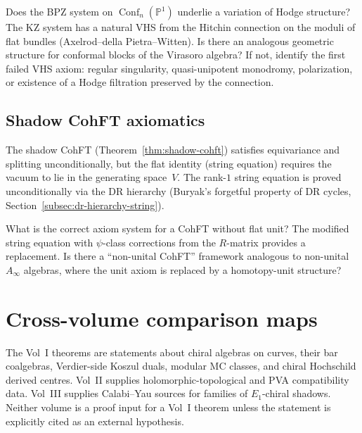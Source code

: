 \begin{question}\label{q:bpz-hitchin}
Does the BPZ system on
$\operatorname{Conf}_n(\mathbb{P}^1)$ underlie a variation of
Hodge structure? The KZ system has a natural VHS from the Hitchin
connection on the moduli of flat bundles (Axelrod--della
Pietra--Witten). Is there an analogous geometric structure for
conformal blocks of the Virasoro algebra? If not, identify the first
failed VHS axiom: regular singularity, quasi-unipotent monodromy,
polarization, or existence of a Hodge filtration preserved by the
connection.
\end{question}

\subsection{Shadow CohFT axiomatics}
\label{subsec:shadow-cohft-axiomatics-notes}

The shadow CohFT (Theorem~\ref{thm:shadow-cohft}) satisfies
equivariance and splitting unconditionally, but the flat identity
(string equation) requires the vacuum to lie in the generating
space~$V$. The rank-$1$ string equation is proved unconditionally via
the DR hierarchy (Buryak's forgetful property of DR cycles,
Section~\ref{subsec:dr-hierarchy-string}).

\begin{question}\label{q:modified-cohft}
What is the correct axiom system for a CohFT without flat unit?
The modified string equation with $\psi$-class corrections from the
$R$-matrix provides a replacement. Is there a ``non-unital CohFT''
framework analogous to non-unital $A_\infty$ algebras, where the
unit axiom is replaced by a homotopy-unit structure?
\end{question}


\section{Cross-volume comparison maps}
\label{sec:cross-volume-bridges}

The Vol~I theorems are statements about chiral algebras on curves,
their bar coalgebras, Verdier-side Koszul duals, modular MC classes,
and chiral Hochschild derived centres. Vol~II supplies
holomorphic-topological and PVA compatibility data. Vol~III supplies
Calabi--Yau sources for families of $E_1$-chiral shadows. Neither
volume is a proof input for a Vol~I theorem unless the statement is
explicitly cited as an external hypothesis.

